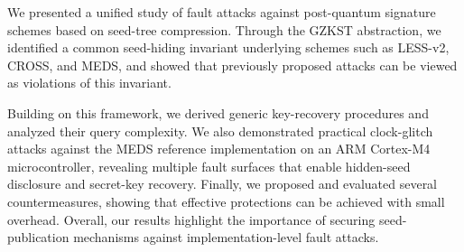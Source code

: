 We presented a unified study of fault attacks against 
post-quantum signature schemes based on seed-tree compression. 
Through the GZKST abstraction, we identified a 
common seed-hiding invariant underlying schemes such as 
LESS-v2, CROSS, and MEDS, and showed that previously 
proposed attacks can be viewed as violations of this 
invariant.

Building on this framework, we derived generic key-recovery 
procedures and analyzed their query complexity. We also 
demonstrated practical clock-glitch attacks against the 
MEDS reference implementation on an ARM Cortex-M4 
microcontroller, revealing multiple fault surfaces that 
enable hidden-seed disclosure and secret-key recovery. 
Finally, we proposed and evaluated several countermeasures, 
showing that effective protections can be achieved with 
small overhead. Overall, our results highlight the 
importance of securing seed-publication mechanisms 
against implementation-level fault attacks.